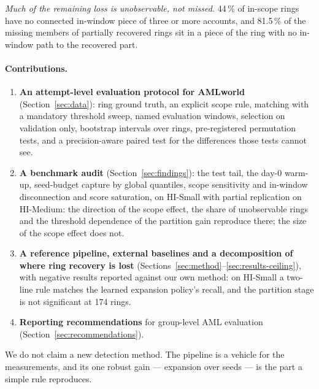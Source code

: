 \emph{Much of the remaining loss is unobservable, not missed.} 44\,\% of in-scope rings have
no connected in-window piece of three or more accounts, and 81.5\,\% of the missing members of
partially recovered rings sit in a piece of the ring with no in-window path to the recovered
part.

\paragraph{Contributions.}
\begin{enumerate}
\item \textbf{An attempt-level evaluation protocol for AMLworld}
  (Section~\ref{sec:data}): ring ground truth, an explicit scope rule, matching with a
  mandatory threshold sweep, named evaluation windows, selection on validation only,
  bootstrap intervals over rings, pre-registered permutation tests, and a precision-aware
  paired test for the differences those tests cannot see.
\item \textbf{A benchmark audit} (Section~\ref{sec:findings}): the test tail, the day-0
  warm-up, seed-budget capture by global quantiles, scope sensitivity and in-window
  disconnection and score saturation, on HI-Small with partial replication on HI-Medium: the
  direction of the scope effect, the share of unobservable rings and the threshold dependence of
  the partition gain reproduce there; the size of the scope effect does not.
\item \textbf{A reference pipeline, external baselines and a decomposition of where ring
  recovery is lost} (Sections~\ref{sec:method}--\ref{sec:results-ceiling}), with negative
  results reported against our own method: on HI-Small a two-line rule matches the learned
  expansion policy's recall, and the partition stage is not significant at 174 rings.
\item \textbf{Reporting recommendations} for group-level AML evaluation
  (Section~\ref{sec:recommendations}).
\end{enumerate}

We do not claim a new detection method. The pipeline is a vehicle for the measurements, and
its one robust gain --- expansion over seeds --- is the part a simple rule reproduces.
